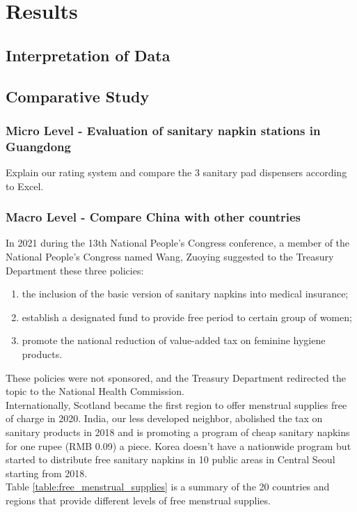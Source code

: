 \section{Results}
\subsection{Interpretation of Data}
\subsection{Comparative Study}
\subsubsection{Micro Level - Evaluation of sanitary napkin stations in Guangdong}
Explain our rating system and compare the 3 sanitary pad dispensers according to Excel.

\subsubsection{Macro Level - Compare China with other countries}
In 2021 during the 13th National People’s Congress conference, a member of the National People’s Congress named Wang, Zuoying suggested to the Treasury Department these three policies:
\begin{enumerate}
    \item the inclusion of the basic version of sanitary napkins into medical insurance;
    \item establish a designated fund to provide free period to certain group of women;
    \item promote the national reduction of value-added tax on feminine hygiene products.
\end{enumerate}
These policies were not sponsored, and the Treasury Department redirected the topic to the National Health Commission.\\

Internationally, Scotland became the first region to offer menstrual supplies free of charge in 2020. India, our less developed neighbor, abolished the tax on sanitary products in 2018 and is promoting a program of cheap sanitary napkins for one rupee (RMB 0.09) a piece. Korea doesn't have a nationwide program but started to distribute free sanitary napkins in 10 public areas in Central Seoul starting from 2018.\\

Table \ref{table:free_menstrual_supplies} is a summary of the 20 countries and regions that provide different levels of free menstrual supplies.



